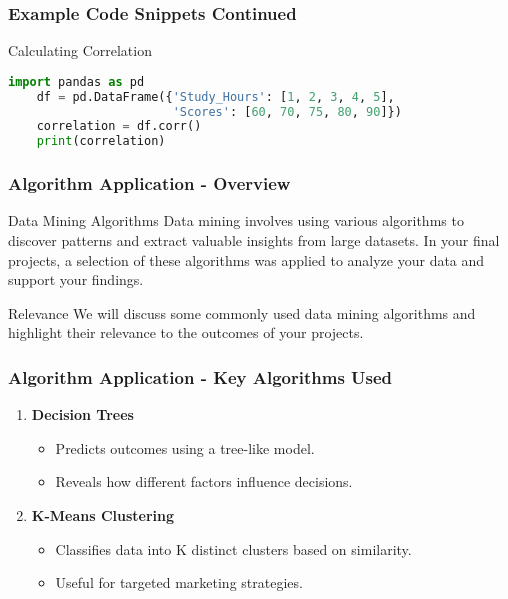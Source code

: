 \documentclass{beamer}
\begin{document}
\begin{frame}[fragile]
    \frametitle{Example Code Snippets Continued}
    \begin{block}{Calculating Correlation}
    \begin{lstlisting}[language=Python]
    import pandas as pd
    df = pd.DataFrame({'Study_Hours': [1, 2, 3, 4, 5], 
                       'Scores': [60, 70, 75, 80, 90]})
    correlation = df.corr()
    print(correlation)
    \end{lstlisting}
    \end{block}
\end{frame}

\begin{frame}[fragile]
    \frametitle{Algorithm Application - Overview}
    \begin{block}{Data Mining Algorithms}
        Data mining involves using various algorithms to discover patterns and extract valuable insights from large datasets. In your final projects, a selection of these algorithms was applied to analyze your data and support your findings.
    \end{block}
    \begin{block}{Relevance}
        We will discuss some commonly used data mining algorithms and highlight their relevance to the outcomes of your projects.
    \end{block}
\end{frame}

\begin{frame}[fragile]
    \frametitle{Algorithm Application - Key Algorithms Used}
    \begin{enumerate}
        \item \textbf{Decision Trees}
            \begin{itemize}
                \item Predicts outcomes using a tree-like model.
                \item Reveals how different factors influence decisions.
            \end{itemize}
        \item \textbf{K-Means Clustering}
            \begin{itemize}
                \item Classifies data into K distinct clusters based on similarity.
                \item Useful for targeted marketing strategies.
            \end{itemize}
    \end{enumerate}
\end{frame}
\end{document}
